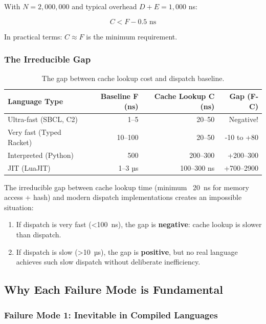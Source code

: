 \documentclass[sigplan,final]{acmart}
\begin{document}
With $N = 2,000,000$ and typical overhead $D + E = 1,000$ ns:

\begin{equation}
C < F - 0.5 \text{ ns}
\end{equation}

In practical terms: $C \approx F$ is the minimum requirement.

\subsubsection{The Irreducible Gap}

\begin{table}[h]
\centering
\caption{The gap between cache lookup cost and dispatch baseline.}
\label{tab:gap}
\begin{tabular}{@{}lrrr@{}}
\toprule
\textbf{Language Type} & \textbf{Baseline F (ns)} & \textbf{Cache Lookup C (ns)} & \textbf{Gap (F-C)} \\
\midrule
Ultra-fast (SBCL, C2) & 1--5 & 20--50 & Negative! \\
Very fast (Typed Racket) & 10--100 & 20--50 & -10 to +80 \\
Interpreted (Python) & 500 & 200--300 & +200--300 \\
JIT (LuaJIT) & 1--3 µs & 100--300 ns & +700--2900 \\
\bottomrule
\end{tabular}
\end{table}

The irreducible gap between cache lookup time (minimum ~20~ns for memory access + hash) and
modern dispatch implementations creates an impossible situation:

\begin{enumerate}
  \item If dispatch is very fast (<100~ns), the gap is \textbf{negative}: cache lookup is slower
    than dispatch.

  \item If dispatch is slow (>10~µs), the gap is \textbf{positive}, but no real language achieves
    such slow dispatch without deliberate inefficiency.
\end{enumerate}

\subsection{Why Each Failure Mode is Fundamental}

\subsubsection{Failure Mode 1: Inevitable in Compiled Languages}
\end{document}
